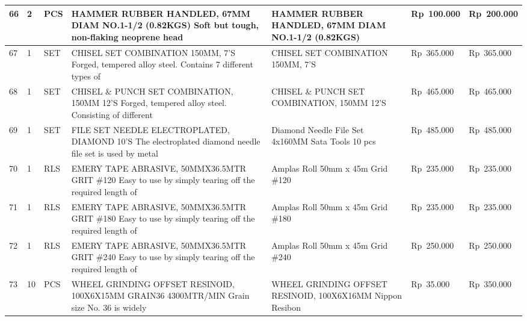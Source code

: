 \documentclass[9pt,a4paper,landscape]{article}
\begin{document}
\begin{longtable}{|C{0.6cm}|C{0.6cm}|C{0.8cm}|L{8.0cm}|L{9.5cm}|R{2.5cm}|R{2.5cm}|}
66 & 2 & PCS &
  HAMMER RUBBER HANDLED, 67MM DIAM NO.1-1/2\newline
  (0.82KGS) Soft but tough, non-flaking neoprene head &
  HAMMER RUBBER HANDLED, 67MM DIAM NO.1-1/2 (0.82KGS) &
  Rp~100.000 & Rp~200.000 \\
\hline

67 & 1 & SET &
  CHISEL SET COMBINATION 150MM, 7'S\newline
  Forged, tempered alloy steel.\newline
  Contains 7 different types of &
  CHISEL SET COMBINATION 150MM, 7'S &
  Rp~365.000 & Rp~365.000 \\
\hline

68 & 1 & SET &
  CHISEL \& PUNCH SET COMBINATION, 150MM 12'S\newline
  Forged, tempered alloy steel.\newline
  Consisting of different &
  CHISEL \& PUNCH SET COMBINATION, 150MM 12'S &
  Rp~465.000 & Rp~465.000 \\
\hline

69 & 1 & SET &
  FILE SET NEEDLE ELECTROPLATED, DIAMOND 10'S\newline
  The electroplated diamond needle file set is used\newline
  by metal &
  Diamond Needle File Set 4x160MM Sata Tools 10 pcs &
  Rp~485.000 & Rp~485.000 \\
\hline

70 & 1 & RLS &
  EMERY TAPE ABRASIVE, 50MMX36.5MTR GRIT \#120\newline
  Easy to use by simply tearing off the required length of &
  Amplas Roll 50mm x 45m Grid \#120 &
  Rp~235.000 & Rp~235.000 \\
\hline

71 & 1 & RLS &
  EMERY TAPE ABRASIVE, 50MMX36.5MTR GRIT \#180\newline
  Easy to use by simply tearing off the required length of &
  Amplas Roll 50mm x 45m Grid \#180 &
  Rp~235.000 & Rp~235.000 \\
\hline

72 & 1 & RLS &
  EMERY TAPE ABRASIVE, 50MMX36.5MTR GRIT \#240\newline
  Easy to use by simply tearing off the required length of &
  Amplas Roll 50mm x 45m Grid \#240 &
  Rp~250.000 & Rp~250.000 \\
\hline

73 & 10 & PCS &
  WHEEL GRINDING OFFSET RESINOID, 100X6X15MM\newline
  GRAIN36 4300MTR/MIN Grain size No. 36 is widely &
  WHEEL GRINDING OFFSET RESINOID, 100X6X16MM Nippon Resibon &
  Rp~35.000 & Rp~350.000 \\
\hline


\end{longtable}
\end{document}
